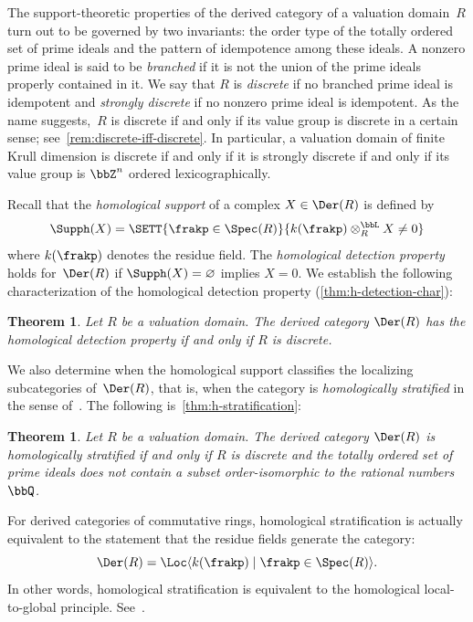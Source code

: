 \documentclass{amsart}
\numberwithin{equation}{section}%
\newtheorem{Thm}[equation]{Theorem}
\theoremstyle{remark}
\renewcommand{\emptyset}{\varnothing}
\begin{document}
The support-theoretic properties of the derived category of a valuation domain~$R$ turn out to be governed by two invariants: the order type of the totally ordered set of prime ideals and the pattern of idempotence among these ideals. A nonzero prime ideal is said to be \emph{branched} if it is not the union of the prime ideals properly contained in it. We say that $R$ is \emph{discrete} if no branched prime ideal is idempotent and \emph{strongly discrete} if no nonzero prime ideal is idempotent. As the name suggests,~$R$ is discrete if and only if its value group is discrete in a certain sense; see~\cref{rem:discrete-iff-discrete}. In particular, a valuation domain of finite Krull dimension is discrete if and only if it is strongly discrete if and only if its value group is $\bbZ^n$ ordered lexicographically. 

Recall that the \emph{homological support} of a complex $X\in\Der(R)$ is defined by
\[
	\Supph(X) = \SETT{\frakp \in \Spec(R)}{k(\frakp) \otimes_R^{\bbL} X \neq 0}
\]
where $k(\frakp)$ denotes the residue field. The \emph{homological detection property} holds for~$\Der(R)$ if $\Supph(X) = \emptyset$ implies $X = 0$. We establish the following characterization of the homological detection property (\cref{thm:h-detection-char}):

\begin{Thm}\label{thm:intro-h-detection-char}
	Let $R$ be a valuation domain. The derived category $\Der(R)$ has the homological detection property if and only if $R$ is discrete.
\end{Thm}

We also determine when the homological support classifies the localizing subcategories of~$\Der(R)$, that is, when the category is \emph{homologically stratified} in the sense of~\cite{BarthelHeardSandersZou26}. The following is~\cref{thm:h-stratification}:

\begin{Thm}\label{thm:intro-h-stratified}
	Let $R$ be a valuation domain. The derived category $\Der(R)$ is homologically stratified if and only if $R$ is discrete and the totally ordered set of prime ideals does not contain a subset order-isomorphic to the rational numbers~$\bbQ$.
\end{Thm}

For derived categories of commutative rings, homological stratification is actually equivalent to the statement that the residue fields generate the category:
\[
	\Der(R) = \Loc\langle k(\frakp) \mid \frakp \in \Spec(R) \rangle.
\]
In other words, homological stratification is equivalent to the homological local-to-global principle. See~\cite[Example~4.10]{BarthelHeardSandersZou26}.
\end{document}
